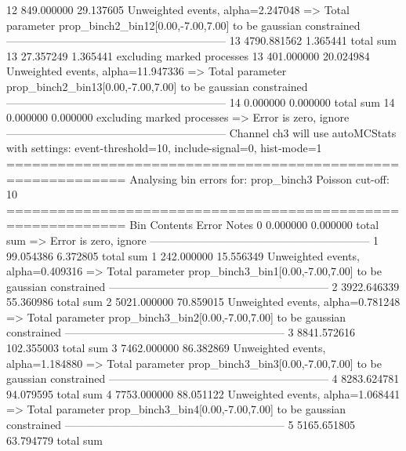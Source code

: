 12         849.000000      29.137605       Unweighted events, alpha=2.247048
  => Total parameter prop_binch2_bin12[0.00,-7.00,7.00] to be gaussian constrained
------------------------------------------------------------
13         4790.881562     1.365441        total sum                     
13         27.357249       1.365441        excluding marked processes    
13         401.000000      20.024984       Unweighted events, alpha=11.947336
  => Total parameter prop_binch2_bin13[0.00,-7.00,7.00] to be gaussian constrained
------------------------------------------------------------
14         0.000000        0.000000        total sum                     
14         0.000000        0.000000        excluding marked processes    
  => Error is zero, ignore      
------------------------------------------------------------
Channel ch3 will use autoMCStats with settings: event-threshold=10, include-signal=0, hist-mode=1
============================================================
Analysing bin errors for: prop_binch3
Poisson cut-off: 10
============================================================
Bin        Contents        Error           Notes                         
0          0.000000        0.000000        total sum                     
  => Error is zero, ignore      
------------------------------------------------------------
1          99.054386       6.372805        total sum                     
1          242.000000      15.556349       Unweighted events, alpha=0.409316
  => Total parameter prop_binch3_bin1[0.00,-7.00,7.00] to be gaussian constrained
------------------------------------------------------------
2          3922.646339     55.360986       total sum                     
2          5021.000000     70.859015       Unweighted events, alpha=0.781248
  => Total parameter prop_binch3_bin2[0.00,-7.00,7.00] to be gaussian constrained
------------------------------------------------------------
3          8841.572616     102.355003      total sum                     
3          7462.000000     86.382869       Unweighted events, alpha=1.184880
  => Total parameter prop_binch3_bin3[0.00,-7.00,7.00] to be gaussian constrained
------------------------------------------------------------
4          8283.624781     94.079595       total sum                     
4          7753.000000     88.051122       Unweighted events, alpha=1.068441
  => Total parameter prop_binch3_bin4[0.00,-7.00,7.00] to be gaussian constrained
------------------------------------------------------------
5          5165.651805     63.794779       total sum                     
